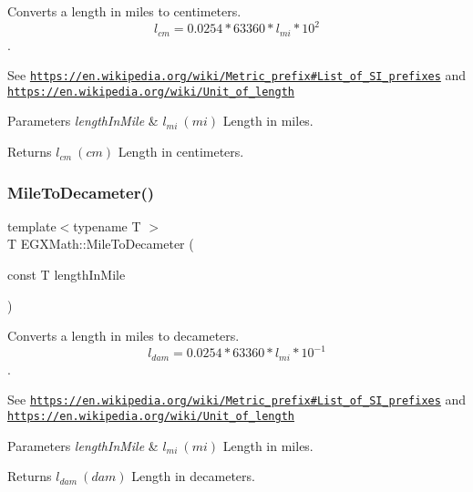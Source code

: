Converts a length in miles to centimeters. \[ l_{cm}=0.0254 * 63360 * l_{mi} * 10^{2} \]. 

See \href{https://en.wikipedia.org/wiki/Metric_prefix#List_of_SI_prefixes}{\tt https\+://en.\+wikipedia.\+org/wiki/\+Metric\+\_\+prefix\#\+List\+\_\+of\+\_\+\+S\+I\+\_\+prefixes} and \href{https://en.wikipedia.org/wiki/Unit_of_length}{\tt https\+://en.\+wikipedia.\+org/wiki/\+Unit\+\_\+of\+\_\+length} 
\begin{DoxyParams}{Parameters}
{\em length\+In\+Mile} & $ l_{mi}\ (mi)$ Length in miles. \\
\hline
\end{DoxyParams}
\begin{DoxyReturn}{Returns}
$ l_{cm}\ (cm)$ Length in centimeters. 
\end{DoxyReturn}
\mbox{\label{group___e_g_x_math-_conversions-_length_conversions-_imperial-_mile-_s_i_ga2f8705f9f0e67cce6a4e19c54ea907b0}} 
\subsubsection{\texorpdfstring{Mile\+To\+Decameter()}{MileToDecameter()}}
{\footnotesize\ttfamily template$<$typename T $>$ \\
T E\+G\+X\+Math\+::\+Mile\+To\+Decameter (\begin{DoxyParamCaption}\item[{const T}]{length\+In\+Mile }\end{DoxyParamCaption})}



Converts a length in miles to decameters. \[ l_{dam}=0.0254 * 63360 * l_{mi} * 10^{-1} \]. 

See \href{https://en.wikipedia.org/wiki/Metric_prefix#List_of_SI_prefixes}{\tt https\+://en.\+wikipedia.\+org/wiki/\+Metric\+\_\+prefix\#\+List\+\_\+of\+\_\+\+S\+I\+\_\+prefixes} and \href{https://en.wikipedia.org/wiki/Unit_of_length}{\tt https\+://en.\+wikipedia.\+org/wiki/\+Unit\+\_\+of\+\_\+length} 
\begin{DoxyParams}{Parameters}
{\em length\+In\+Mile} & $ l_{mi}\ (mi)$ Length in miles. \\
\hline
\end{DoxyParams}
\begin{DoxyReturn}{Returns}
$ l_{dam}\ (dam)$ Length in decameters. 
\end{DoxyReturn}
\mbox{\label{group___e_g_x_math-_conversions-_length_conversions-_imperial-_mile-_s_i_ga678ca464b305b9425fbec0b1f53fb983}} 
